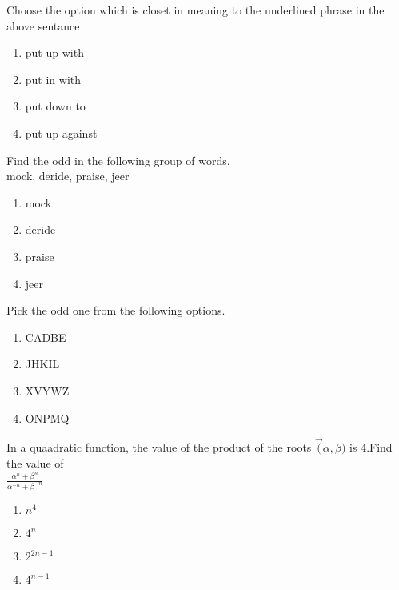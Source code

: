     Choose the option which is closet in meaning to the underlined phrase in the above sentance\\
    \begin{enumerate}
        \item put up with\\
        \item put in with\\
        \item put down to\\
        \item put up against
    \end{enumerate}
    \item Find the odd in the following group of words.\\
                     mock, deride, praise, jeer\\
    \begin{enumerate}
        \item mock\\
        \item deride\\
        \item praise\\
        \item jeer
    \end{enumerate}
    \item Pick the odd one from the following options.\\
    \begin{enumerate}
    \item CADBE\\
    \item JHKIL\\
    \item XVYWZ\\
    \item ONPMQ
    \end{enumerate}
    \item In a quaadratic function, the value of the product of the roots $\vec(\alpha,\beta)$ is $4$.Find the value of\\
                              $\frac{\alpha^{n} + \beta^{n}}{\alpha^{-n} + \beta^{-n}}$\\
    \begin{enumerate}
        \item$n^{4}$\\
        \item$4^{n}$\\
        \item$2^{2n-1}$\\
        \item$4^{n-1}$
        \end{enumerate}
